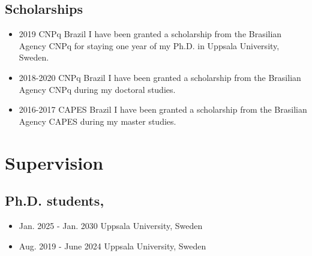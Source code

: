 \documentclass[10pt,A4]{article} %
\begin{document}
\subsection{Scholarships}
 \begin{itemize}
    \item   {}
    { 2019 }
    { CNPq }
    { Brazil }
    { I have been granted a scholarship from the Brasilian Agency CNPq for staying one year of my Ph.D. in Uppsala University, Sweden. }
    \item {}
    { 2018-2020 }
    { CNPq }
    { Brazil }
    { I have been granted a scholarship from the Brasilian Agency CNPq during my doctoral studies. }
    \item {}
    { 2016-2017 }
    { CAPES }
    { Brazil }
    { I have been granted a scholarship from the Brasilian Agency CAPES during my master studies. }

  \end{itemize}


\section{Supervision}


  \subsection{\noindent Ph.D.  students,   }
  \begin{itemize}
    
        \item {}
        { Jan. 2025 - Jan. 2030 }
        { Uppsala University, Sweden }
        {  }
     
        \item {}
        { Aug. 2019 - June 2024 }
        { Uppsala University, Sweden }
        {  }
     
  \end{itemize}
\end{document}
